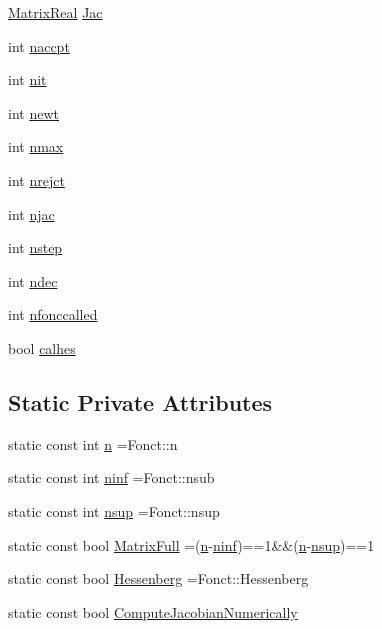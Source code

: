 \begin{DoxyCompactItemize}
\hyperlink{classodes_1_1Radau5cc_a8ef067b8852403d48d8528f601a4626a}{Matrix\+Real} \hyperlink{classodes_1_1Radau5cc_a67b952c35d2c7ecddc9dd75cb2c3afe1}{Jac}
\item 
int \hyperlink{classodes_1_1Radau5cc_a39e641457e737321720c75578189d0db}{naccpt}
\item 
int \hyperlink{classodes_1_1Radau5cc_a98eae21674bed3d783e49f92f7c38a20}{nit}
\item 
int \hyperlink{classodes_1_1Radau5cc_a957de41c2a36e2f254836a6c05dbfb92}{newt}
\item 
int \hyperlink{classodes_1_1Radau5cc_a42980e5cf06bc0f4c1a0ef1a1922615f}{nmax}
\item 
int \hyperlink{classodes_1_1Radau5cc_a04e6193a9f5be15a7e969b2ad4e5f344}{nrejct}
\item 
int \hyperlink{classodes_1_1Radau5cc_ade6f8961bd6dacdc3e89761d8af04172}{njac}
\item 
int \hyperlink{classodes_1_1Radau5cc_af1a16f749cd5fd53c66af9a913a37d0a}{nstep}
\item 
int \hyperlink{classodes_1_1Radau5cc_af849903adc1f88a3bc6042994bec5621}{ndec}
\item 
int \hyperlink{classodes_1_1Radau5cc_a6363884e5172cc77c13a1d9ca9ed630a}{nfonccalled}
\item 
bool \hyperlink{classodes_1_1Matrices_a82e935680c27f58bcff8a559700411c6}{calhes}
\end{DoxyCompactItemize}
\subsection*{Static Private Attributes}
\begin{DoxyCompactItemize}
\item 
static const int \hyperlink{classodes_1_1Radau5cc_a3be3f05d2cdf7268e7d09b62ad9ad494}{n} =Fonct\+::n
\item 
static const int \hyperlink{classodes_1_1Radau5cc_ac47e67a43369971eeb08c2d2200a76d5}{ninf} =Fonct\+::nsub
\item 
static const int \hyperlink{classodes_1_1Radau5cc_a4e80b8064e4d8f60262591531fcd1ff0}{nsup} =Fonct\+::nsup
\item 
static const bool \hyperlink{classodes_1_1Radau5cc_a8e67471bdbf858fff865561d859a066a}{Matrix\+Full} =(\hyperlink{classodes_1_1Radau5cc_a3be3f05d2cdf7268e7d09b62ad9ad494}{n}-\/\hyperlink{classodes_1_1Radau5cc_ac47e67a43369971eeb08c2d2200a76d5}{ninf})==1\&\&(\hyperlink{classodes_1_1Radau5cc_a3be3f05d2cdf7268e7d09b62ad9ad494}{n}-\/\hyperlink{classodes_1_1Radau5cc_a4e80b8064e4d8f60262591531fcd1ff0}{nsup})==1
\item 
static const bool \hyperlink{classodes_1_1Radau5cc_ae66683695f55d21d7c11ca7e3323d0e9}{Hessenberg} =Fonct\+::\+Hessenberg
\item 
static const bool \hyperlink{classodes_1_1Radau5cc_a742c490578cf9e4dcf692e6706c2ec90}{Compute\+Jacobian\+Numerically}
\end{DoxyCompactItemize}


